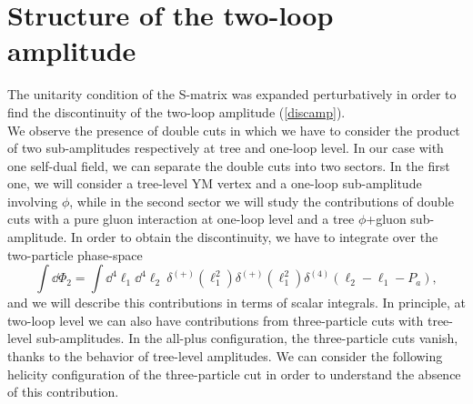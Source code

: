 \section{Structure of the two-loop amplitude}
The unitarity condition of the S-matrix was expanded perturbatively in order to find the discontinuity of the two-loop amplitude (\ref{discamp}).\\
We observe the presence of double cuts in which we have to consider the product of two sub-amplitudes respectively at tree and one-loop level. In our case with one self-dual field, we can separate the double cuts into two sectors. In the first one, we will consider a tree-level YM vertex and a one-loop sub-amplitude involving $\phi$, while in the second sector we will study the contributions of double cuts with a pure gluon interaction at one-loop level and a tree $\phi$+gluon sub-amplitude. In order to obtain the discontinuity, we have to integrate over the two-particle phase-space
\begin{equation}
	\int \dd\Phi_2=\int \dd^4\ell_1 \dd^4\ell_2 \ \delta^{(+)}(\ell_1^2)\delta^{(+)}(\ell_1^2)\delta^{(4)}(\ell_2-\ell_1-P_a),	\label{phase-space}
\end{equation}
and we will describe this contributions in terms of scalar integrals.
In principle, at two-loop level we can also have contributions from three-particle cuts with tree-level sub-amplitudes. In the all-plus configuration, the three-particle cuts vanish, thanks to the behavior of tree-level amplitudes. We can consider the following helicity configuration of the three-particle cut in order to understand the absence of this contribution.
